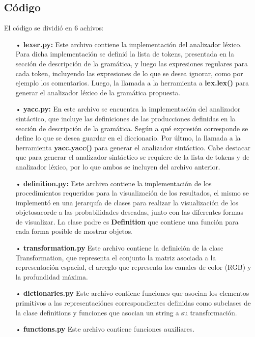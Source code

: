 \subsection{C\'odigo}

El c\'odigo se dividi\'o en 6 achivos:
\begin{itemize}
\item[•] \textbf{lexer.py:} Este archivo contiene la implementaci\'on del analizador l\'exico. Para dicha implementaci\'on se defini\'o la lista de tokens, presentada en la secci\'on de descripci\'on de la gram\'atica, y luego las expresiones regulares para cada token, incluyendo las expresiones de lo que se desea ignorar, como por ejemplo los comentarios. Luego, la llamada a la herramienta a \textbf{lex.lex()} para generar el analizador l\'exico de la gram\'atica propuesta.

\item[•] \textbf{yacc.py:} En este archivo se encuentra la implementaci\'on del analizador sint\'actico, que incluye las definiciones de las producciones definidas en la secci\'on de descripci\'on de la gram\'atica. Seg\'un a qu\'e expresi\'on corresponde se define lo que se desea guardar en el diccionario. Por \'ultmo, la llamada a la herramienta \textbf{yacc.yacc()} para generar el analizador sint\'actico. Cabe destacar que para generar el analizador sint\'actico se requiere de la lista de tokens y de analizador l\'exico, por lo que ambos se incluyen del archivo anterior.

\item[•] \textbf{definition.py:} Este archivo contiene la implementaci\'on de los procedimientos requeridos para la visualizaci\'on de los resultados, el mismo se implement\'o en una jerarqu\'ia de clases para realizar la visualizaci\'on de los objetosacorde a las probabilidades deseadas, junto con las diferentes formas de visualizar. La clase padre es \textbf{Definition} que contiene una funci\'on para cada forma posible de mostrar objetos. 

\item[•] \textbf{transformation.py} Este archivo contiene la definici\'on de la clase Transformation, que representa el conjunto la matriz asociada a la representaci\'on espacial, el arreglo que representa los canales de color (RGB) y la profundidad m\'axima.

\item[•] \textbf{dictionaries.py} Este archivo contiene funciones que asocian los elementos primitivos a las representaci\'ones correspondientes definidas como subclases de la clase definitions y funciones que asocian un string a su transformaci\'on.

\item[•] \textbf{functions.py} Este archivo contiene funciones auxiliares.
\end{itemize}

